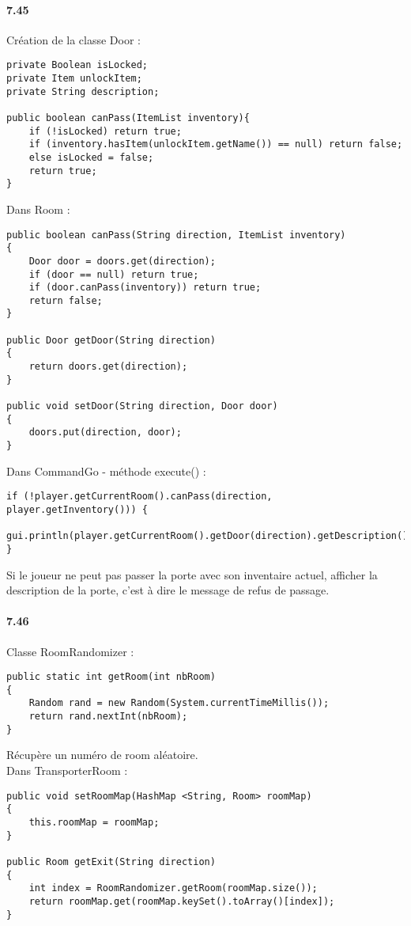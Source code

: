 \documentclass[11pt,a4paper]{report}
\begin{document}
\paragraph{7.45}
Création de la classe Door :
\begin{lstlisting}
private Boolean isLocked;
private Item unlockItem;
private String description;

public boolean canPass(ItemList inventory){
    if (!isLocked) return true;
    if (inventory.hasItem(unlockItem.getName()) == null) return false;
    else isLocked = false;
    return true;
}
\end{lstlisting}
Dans Room :
\begin{lstlisting}
public boolean canPass(String direction, ItemList inventory)
{
    Door door = doors.get(direction);
    if (door == null) return true;
    if (door.canPass(inventory)) return true;
    return false;
}

public Door getDoor(String direction)
{
    return doors.get(direction);
}

public void setDoor(String direction, Door door)
{
    doors.put(direction, door);
}
\end{lstlisting}
Dans CommandGo - méthode execute() :
\begin{lstlisting}
if (!player.getCurrentRoom().canPass(direction, player.getInventory())) {
    gui.println(player.getCurrentRoom().getDoor(direction).getDescription());
}
\end{lstlisting}
Si le joueur ne peut pas passer la porte avec son inventaire actuel, afficher la description de la porte, c'est à dire le message de refus de passage.

\paragraph{7.46}
Classe RoomRandomizer :
\begin{lstlisting}
public static int getRoom(int nbRoom)
{
    Random rand = new Random(System.currentTimeMillis());
    return rand.nextInt(nbRoom);
}
\end{lstlisting}
Récupère un numéro de room aléatoire.\\
Dans TransporterRoom :
\begin{lstlisting}
public void setRoomMap(HashMap <String, Room> roomMap)
{
    this.roomMap = roomMap;
}

public Room getExit(String direction)
{
    int index = RoomRandomizer.getRoom(roomMap.size());
    return roomMap.get(roomMap.keySet().toArray()[index]);
}
\end{lstlisting}
\end{document}
